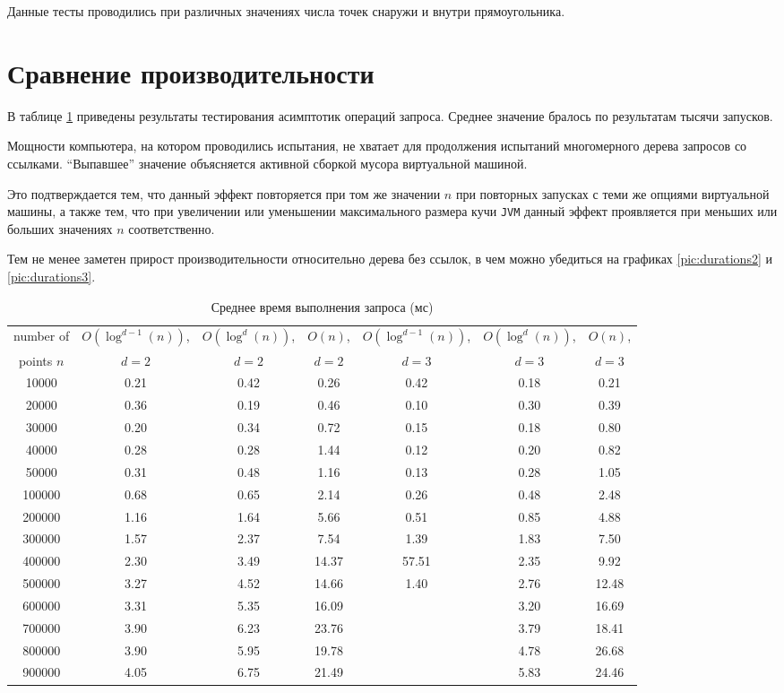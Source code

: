 \documentclass[12pt,a4paper]{article}
\begin{document}
Данные тесты проводились при различных значениях числа точек снаружи и внутри прямоугольника.

\section*{Сравнение производительности}

В таблице \ref{table:durations} приведены результаты тестирования асимптотик операций запроса. Среднее значение бралось по результатам тысячи запусков.

Мощности компьютера, на котором проводились испытания, не хватает для продолжения испытаний многомерного дерева запросов со ссылками. ``Выпавшее'' значение объясняется активной сборкой мусора виртуальной машиной.

Это подтверждается тем, что данный эффект повторяется  при том же значении $n$ при повторных запусках с теми же опциями виртуальной машины, а также тем, что при увеличении или уменьшении максимального размера кучи \texttt{JVM} данный эффект проявляется при меньших  или больших значениях $n$ соответственно.

Тем не менее заметен прирост производительности относительно дерева без ссылок, в чем можно убедиться на графиках \ref{pic:durations2} и \ref{pic:durations3}.

\begin{table}[h]
	\begin{tabular}{c || c | c | c || c | c | c}
		number of & $O(\log^{d - 1}(n))$, & $O(\log^d(n))$, & $O(n)$, & $O(\log^{d - 1}(n))$, & $O(\log^d(n))$, & $O(n)$, \\
		points $n$ & $d=2$ & $d=2$ & $d=2$ & $d=3$ & $d=3$ & $d=3$ \\
		\hline
		10000 & 0.21 & 0.42 & 0.26 & 0.42 & 0.18 & 0.21 \\
		20000 & 0.36 & 0.19 & 0.46 & 0.10 & 0.30 & 0.39 \\
		30000 & 0.20 & 0.34 & 0.72 & 0.15 & 0.18 & 0.80 \\
		40000 & 0.28 & 0.28 & 1.44 & 0.12 & 0.20 & 0.82 \\
		50000 & 0.31 & 0.48 & 1.16 & 0.13 & 0.28 & 1.05 \\
		100000 & 0.68 & 0.65 & 2.14 & 0.26 & 0.48 & 2.48 \\
		200000 & 1.16 & 1.64 & 5.66 & 0.51 & 0.85 & 4.88 \\
		300000 & 1.57 & 2.37 & 7.54 & 1.39 &1.83 & 7.50 \\
		400000 & 2.30 & 3.49 & 14.37 & 57.51 & 2.35 & 9.92 \\
		500000 & 3.27 & 4.52 & 14.66 & 1.40 & 2.76 & 12.48 \\
		600000 & 3.31 & 5.35 & 16.09 & & 3.20 & 16.69 \\
		700000 & 3.90 & 6.23 & 23.76 & & 3.79 & 18.41 \\
		800000 & 3.90 & 5.95 & 19.78 & & 4.78 & 26.68 \\
		900000 & 4.05 & 6.75 & 21.49 & & 5.83 & 24.46 \\
	\end{tabular}

	\caption{Среднее время выполнения запроса (мс)}
	\label{table:durations}
\end{table}
\end{document}
